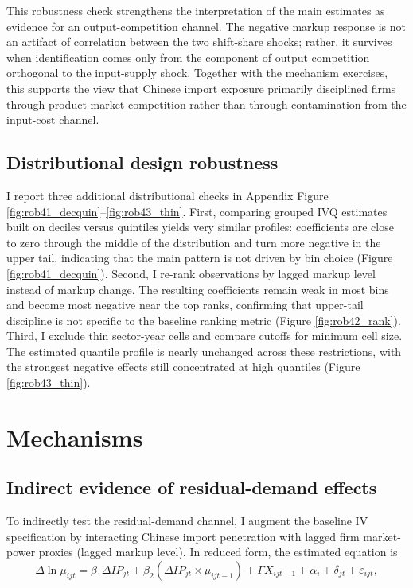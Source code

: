 \documentclass[12pt]{article}
\begin{document}
This robustness check strengthens the interpretation of the main estimates as evidence for an output-competition channel. The negative markup response is not an artifact of correlation between the two shift-share shocks; rather, it survives when identification comes only from the component of output competition orthogonal to the input-supply shock. Together with the mechanism exercises, this supports the view that Chinese import exposure primarily disciplined firms through product-market competition rather than through contamination from the input-cost channel.

\subsection{Distributional design robustness}
I report three additional distributional checks in Appendix Figure \ref{fig:rob41_decquin}--\ref{fig:rob43_thin}. First, comparing grouped IVQ estimates built on deciles versus quintiles yields very similar profiles: coefficients are close to zero through the middle of the distribution and turn more negative in the upper tail, indicating that the main pattern is not driven by bin choice (Figure \ref{fig:rob41_decquin}). Second, I re-rank observations by lagged markup level instead of markup change. The resulting coefficients remain weak in most bins and become most negative near the top ranks, confirming that upper-tail discipline is not specific to the baseline ranking metric (Figure \ref{fig:rob42_rank}). Third, I exclude thin sector-year cells and compare cutoffs for minimum cell size. The estimated quantile profile is nearly unchanged across these restrictions, with the strongest negative effects still concentrated at high quantiles (Figure \ref{fig:rob43_thin}).


\section{Mechanisms}

\subsection{Indirect evidence of residual-demand effects}
To indirectly test the residual-demand channel, I augment the baseline IV specification by interacting Chinese import penetration with lagged firm market-power proxies (lagged markup level). In reduced form, the estimated equation is
\[
\Delta \ln \mu_{ijt} = \beta_1 \Delta IP_{jt} + \beta_2 (\Delta IP_{jt} \times \mu_{ijt-1}) + \Gamma X_{ijt-1} + \alpha_i + \delta_{jt} + \varepsilon_{ijt},
\]
\end{document}
